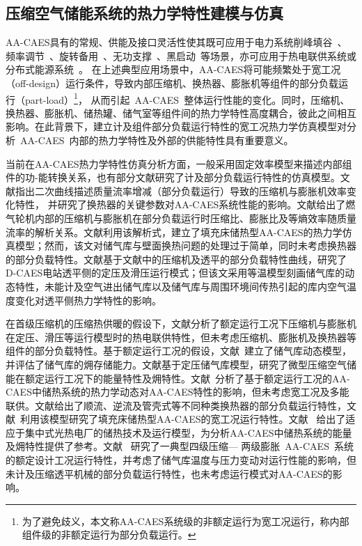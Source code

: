 \subsection{压缩空气储能系统的热力学特性建模与仿真}

AA-CAES具有的常规、供能及接口灵活性使其既可应用于电力系统削峰填谷~\cite{CAES-MultiValue-11,CAES-Princeton-08}、频率调节~\cite{CAES-Congession-09,CAES-Reserve-11}、旋转备用~\cite{CAES-Congession-09,CAES-Reserve-11}、无功支撑~\cite{CAES-Reactive-13,CAES-Reactive-18-LGK}、黑启动~\cite{Huntorf-20-01}等场景，亦可应用于热电联供系统或分布式能源系统~\cite{CAES-Review-18-Rui-operation,CAES-IES-16-Rui,Trigen-mCAES-15,CAES-Alberta-14}。 在上述典型应用场景中，AA-CAES将可能频繁处于宽工况（off-design）运行条件，导致内部压缩机、换热器、膨胀机等组件的部分负载运行（part-load）\footnote{为了避免歧义，本文称AA-CAES系统级的非额定运行为宽工况运行，称内部组件级的非额定运行为部分负载运行。}， 从而引起~AA-CAES~整体运行性能的变化。同时，压缩机、换热器、膨胀机、储热罐、储气室等组件间的热力学特性高度耦合，彼此之间相互影响。在此背景下，建立计及组件部分负载运行特性的宽工况热力学仿真模型对分析~AA-CAES~内部的热力学特性及外部的供能特性具有重要意义。

当前在AA-CAES热力学特性仿真分析方面，一般采用固定效率模型来描述内部组件的功-能转换关系，也有部分文献研究了计及部分负载运行特性的仿真模型。文献指出二次曲线描述质量流率增减（部分负载运行）导致的压缩机与膨胀机效率变化特性， 并研究了换热器的关键参数对AA-CAES系统性能的影响。文献给出了燃气轮机内部的压缩机与膨胀机在部分负载运行时压缩比、膨胀比及等熵效率随质量流率的解析关系。文献利用该解析式，建立了填充床储热型AA-CAES的热力学仿真模型；然而，该文对储气库与壁面换热问题的处理过于简单，同时未考虑换热器的部分负载特性。文献基于文献中的压缩机及透平的部分负载特性曲线，研究了D-CAES电站透平侧的定压及滑压运行模式；但该文采用等温模型刻画储气库的动态特性，未能计及空气进出储气库以及储气库与周围环境间传热引起的库内空气温度变化对透平侧热力学特性的影响。

在首级压缩机的压缩热供暖的假设下，文献分析了额定运行工况下压缩机与膨胀机在定压、滑压等运行模型时的热电联供特性，但未考虑压缩机、膨胀机及换热器等组件的部分负载特性。基于额定运行工况的假设，文献~建立了储气库动态模型，并评估了储气库的㶲存储能力。文献基于定压储气库模型，研究了微型压缩空气储能在额定运行工况下的能量特性及㶲特性。文献~分析了基于额定运行工况的AA-CAES中储热系统的热力学动态对AA-CAES特性的影响，但未考虑宽工况及多能联供。文献给出了顺流、逆流及管壳式等不同种类换热器的部分负载运行特性，文献~利用该模型研究了填充床储热型AA-CAES的宽工况运行特性。文献~ 给出了适应于集中式光热电厂的储热技术及运行模型，为分析AA-CAES中储热系统的能量及㶲特性提供了参考。文献~ 研究了一典型四级压缩— 两级膨胀~AA-CAES~系统的额定设计工况运行特性，并考虑了储气库温度与压力变动对运行性能的影响，但未计及压缩透平机械的部分负载运行特性，也未考虑运行模式对AA-CAES的影响。


